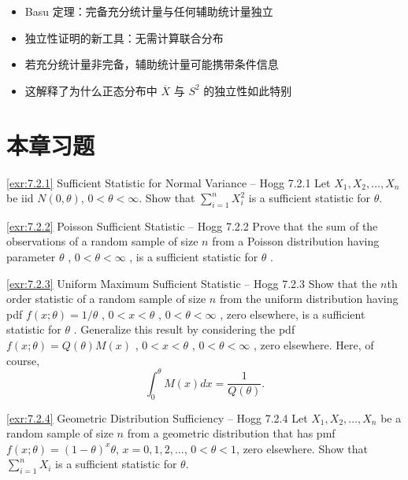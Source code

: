 \begin{itemize}
\item Basu 定理：完备充分统计量与任何辅助统计量独立
\item 独立性证明的新工具：无需计算联合分布
\item 若充分统计量非完备，辅助统计量可能携带条件信息
\item 这解释了为什么正态分布中 $\overline{X}$ 与 $S^2$ 的独立性如此特别
\end{itemize}

\section*{本章习题}

\begin{exercise}{\ref{exr:7.2.1} Sufficient Statistic for Normal Variance – Hogg 7.2.1}\label{exr:7.2.1}
Let $X_{1}, X_{2}, \ldots, X_{n}$ be iid $N(0, \theta)$, $0 < \theta < \infty$. Show that $\sum_{i=1}^{n} X_{i}^{2}$ is a sufficient statistic for $\theta$.
\end{exercise}

\begin{exercise}{\ref{exr:7.2.2} Poisson Sufficient Statistic – Hogg 7.2.2}\label{exr:7.2.2}
Prove that the sum of the observations of a random sample of size $n$ from a Poisson distribution having parameter $\theta$ , $0 < \theta < \infty$ , is a sufficient statistic for $\theta$ .
\end{exercise}

\begin{exercise}{\ref{exr:7.2.3} Uniform Maximum Sufficient Statistic – Hogg 7.2.3}\label{exr:7.2.3}
Show that the $n$th order statistic of a random sample of size $n$ from the uniform distribution having pdf $f(x; \theta) = 1 / \theta$ , $0 < x < \theta$ , $0 < \theta < \infty$ , zero elsewhere, is a sufficient statistic for $\theta$ . Generalize this result by considering the pdf $f(x; \theta) = Q(\theta) M(x)$ , $0 < x < \theta$ , $0 < \theta < \infty$ , zero elsewhere. Here, of course,
\[
\int_{0}^{\theta} M(x) dx = \frac{1}{Q(\theta)}.
\]
\end{exercise}

\begin{exercise}{\ref{exr:7.2.4} Geometric Distribution Sufficiency – Hogg 7.2.4}\label{exr:7.2.4}
Let $X_{1}, X_{2}, \ldots, X_{n}$ be a random sample of size $n$ from a geometric distribution that has pmf $f(x; \theta) = (1 - \theta)^{x}\theta$, $x = 0, 1, 2, \ldots$, $0 < \theta < 1$, zero elsewhere. Show that $\sum_{i=1}^{n} X_{i}$ is a sufficient statistic for $\theta$.
\end{exercise}

